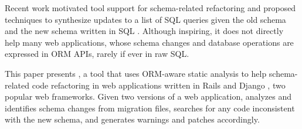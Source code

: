  

Recent work motivated tool support for schema-related refactoring  \cite{wang2017verifying} and proposed techniques to synthesize updates to a list of 
SQL queries given the old schema and the new schema written in SQL
\cite{wang2019synthesizing}. Although inspiring, it does not directly help
many web applications, whose schema changes
and database operations are expressed in ORM APIs, rarely if ever in raw SQL.




This paper presents {}, a tool that uses ORM-aware static analysis to help schema-related code refactoring in web applications
written in Rails \cite{rails} and Django \cite{django}, two popular web frameworks.
Given two versions of a web application, 
\ETool{} analyzes and identifies schema changes from
migration files, searches for
any code inconsistent with the new schema,
and generates warnings and patches accordingly. %

